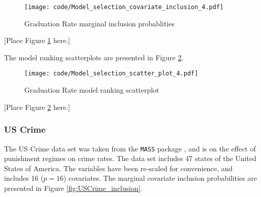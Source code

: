 \documentclass{amsart}[12pt]
\begin{document}

\begin{figure}[p]
	\texttt{[image: code/Model\_selection\_covariate\_inclusion\_4.pdf]}
	\caption{Graduation Rate marginal inclusion probablities}
	\label{fig:GradRate_inclusion}
\end{figure}

[Place Figure \ref{fig:GradRate_inclusion} here.]

The model ranking scatterplots are presented in Figure \ref{fig:GradRate_model_ranking}.

\begin{figure}[p]
	\texttt{[image: code/Model\_selection\_scatter\_plot\_4.pdf]}
	\caption{Graduation Rate model ranking scatterplot}
	\label{fig:GradRate_model_ranking}
\end{figure}

[Place Figure \ref{fig:GradRate_model_ranking} here.]

\subsubsection{US Crime}

The US Crime data set was taken from the \texttt{MASS} package \cite{Venables2002}, and is on the effect of
punishment regimes on crime rates. The data set includes 47 states of the United States of America. The
variables have been re-scaled for convenience, and includes 16 ($p=16$) covariates. The marginal covariate
inclusion probabilities are presented in Figure \ref{fig:USCrime_inclusion}.

\end{document}
